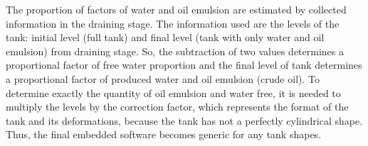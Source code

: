 
The proportion of factors of water and oil emulsion are estimated by collected
information in the draining stage. The information used are the levels of the
tank: initial level (full tank) and final level (tank with only water and oil
emulsion) from draining stage. So, the subtraction of two values determines a
proportional factor of free water proportion and the final level of tank
determines a proportional factor of produced water and oil emulsion (crude oil).
To determine exactly the quantity of oil emulsion and water free, it is needed to
multiply the levels by the correction factor, which represents the format of the
tank and its deformations, because the tank has not a perfectly cylindrical
shape. Thus, the final embedded software becomes generic for any tank shapes.



